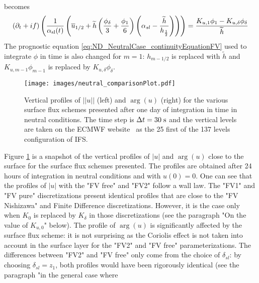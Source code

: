 becomes
\begin{equation}
	\label{eq:ND_NeutralCase_semiDiscreteEkmanEqFVfree}
	(\partial_t+if) \left(\frac{1}{\alpha_{\rm sl}(t)}
	\left(\overline{u}_{1/2} + \widetilde{h}
	\left(\frac{\phi_{\delta}}{3} + \frac{\phi_1}{6}\right)
	\left(\alpha_{sl} - \frac{\widetilde{h}}{h_{\frac{1}{2}}}\right)
	\right)\right)
	= \frac{K_{u, 1}\phi_1 - K_{u,\delta} \phi_{\delta}}{\widetilde{h}}
\end{equation}
The prognostic equation \eqref{eq:ND_NeutralCase_continuityEquationFV}
used to integrate $\phi$ in time
is also changed for $m=1$: $h_{m-1/2}$ is replaced
with $\widetilde{h}$ and $K_{u, m-1}\phi_{m-1}$ is replaced by
$K_{u,\delta}\phi_{\delta}$.
%
\begin{figure}[htpb]
	\centering
	\texttt{[image: images/neutral\_comparisonPlot.pdf]}
	\caption[Vertical profiles of $|u|$ and $\arg(u)$]
	{Vertical profiles of $||u||$ (left) and $\arg(u)$ (right)
	for the various surface flux schemes presented
	after one day of integration in time in neutral conditions.
	The time step is $\Delta t = 30 \;{\rm s}$
	and the vertical levels are taken
	on the ECMWF website\footnotemark ~ as the 25 first
	of the 137 levels configuration of IFS.
	}
	\label{fig:ND_NeutralCase_comparisonPlot}
\end{figure}
\par
Figure \ref{fig:ND_NeutralCase_comparisonPlot} is a snapshot of
the vertical profiles of $|u|$ and $\arg(u)$ close to the surface
for the surface flux schemes presented.
The profiles are obtained after 24 hours of integration in neutral
conditions and with $u(0) = 0$.
One can see that the profiles of $|u|$ with the "FV free" and "FV2"
follow a wall law. The "FV1" and "FV pure" discretizations
present identical profiles that are close to the "FV Nishizawa" and
Finite Difference discretizations.
However, it is the case only when $K_0$ is
replaced by $K_{\delta}$ in those discretizations
(see the paragraph "On the value of $K_{u,0}$" below).
The profile of $\arg(u)$ is significantly affected by the surface
flux scheme: it is not surprising as the Coriolis effect is
not taken into account in the surface layer for the "FV2" and
"FV free" parameterizations.
The differences between "FV2" and "FV free" only come from the
choice of $\delta_{sl}$:
by choosing $\delta_{sl}=z_1$, both profiles would have been
rigorously identical
(see the paragraph "in the general case where
